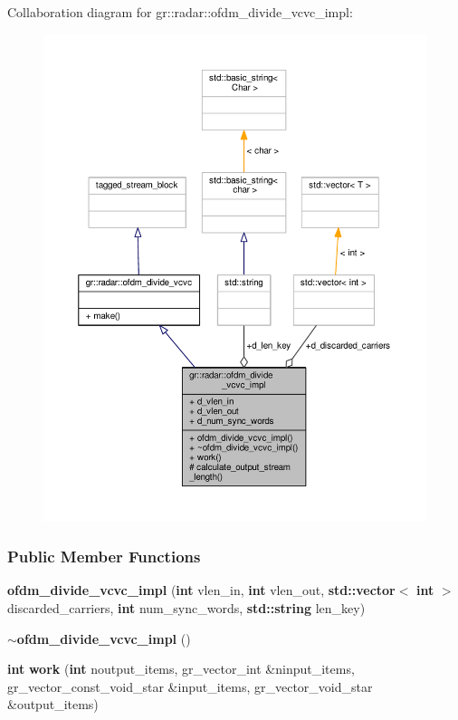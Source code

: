 Collaboration diagram for gr\+:\+:radar\+:\+:ofdm\+\_\+divide\+\_\+vcvc\+\_\+impl\+:
\nopagebreak
\begin{figure}[H]
\begin{center}
\leavevmode
\includegraphics[width=350pt]{d4/dca/classgr_1_1radar_1_1ofdm__divide__vcvc__impl__coll__graph}
\end{center}
\end{figure}
\subsubsection*{Public Member Functions}
\begin{DoxyCompactItemize}
\item 
{\bf ofdm\+\_\+divide\+\_\+vcvc\+\_\+impl} ({\bf int} vlen\+\_\+in, {\bf int} vlen\+\_\+out, {\bf std\+::vector}$<$ {\bf int} $>$ discarded\+\_\+carriers, {\bf int} num\+\_\+sync\+\_\+words, {\bf std\+::string} len\+\_\+key)
\item 
{\bf $\sim$ofdm\+\_\+divide\+\_\+vcvc\+\_\+impl} ()
\item 
{\bf int} {\bf work} ({\bf int} noutput\+\_\+items, gr\+\_\+vector\+\_\+int \&ninput\+\_\+items, gr\+\_\+vector\+\_\+const\+\_\+void\+\_\+star \&input\+\_\+items, gr\+\_\+vector\+\_\+void\+\_\+star \&output\+\_\+items)
\end{DoxyCompactItemize}
